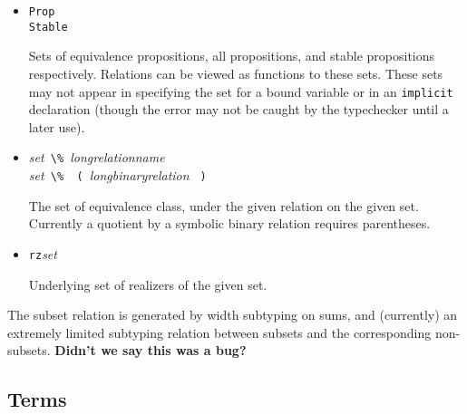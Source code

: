 \documentclass[12pt]{article}
\newcommand{\keywd}[1]{\mbox{\texttt{#1}}\xspace}
\newcommand{\EQUIVPROP}{\keywd{Equiv}}
\newcommand{\IMPLICIT}{\keywd{implicit}}
\newcommand{\PROP}{\keywd{Prop}}
\newcommand{\RZ}{\keywd{rz}}
\newcommand{\STABLEPROP}{\keywd{Stable}}
\newcommand{\metav}[1]{\mbox{\textit{#1}}\xspace}
\newcommand{\Setexp}{\metav{set}}
\newcommand{\LPAREN}{\mbox{\Verb| ( |}}
\newcommand{\PERCENT}{\mbox{\Verb+ \% +}}
\newcommand{\RPAREN}{\mbox{\Verb| ) |}}
\begin{document}
\begin{itemize}
\item %
      \PROP\\
      \STABLEPROP

  Sets of equivalence propositions, all propositions, and stable
  propositions respectively.  Relations can be viewed as functions
  to these sets.  These sets may not appear in specifying the set
  for a bound variable or in an \IMPLICIT declaration (though
  the error may not be caught by the typechecker until a later use).

\iffalse
\EQUIVPROP is used internally by the typechecker,
  but there's currently no way to specify this set in the source.
  Is this a bug?

No --- it's not a set in the topos, so we don't 
\fi

\item \Setexp \PERCENT \metav{longrelationname}\\
      \Setexp \PERCENT \LPAREN \metav{longbinaryrelation} \RPAREN

  The set of equivalence class, under the given relation on the
  given set. Currently a quotient by a symbolic binary relation requires
  parentheses.

\item \RZ \Setexp

  Underlying set of realizers of the given set.
\end{itemize}


The subset relation is generated by width subtyping on sums, and
(currently) an extremely limited subtyping relation between
subsets and the corresponding non-subsets.  
\textbf{Didn't we say this was a bug?}

\subsection{Terms}
\end{document}
